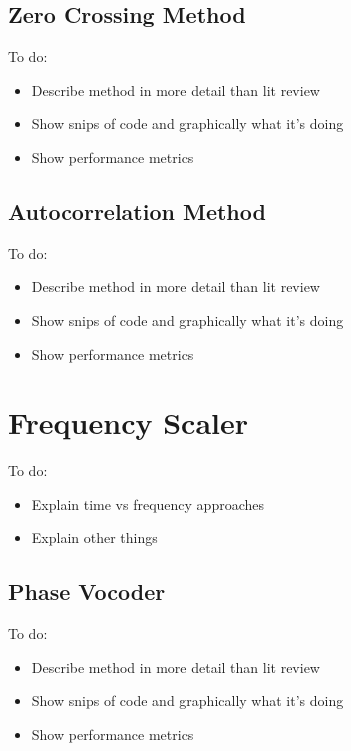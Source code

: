\subsection{Zero Crossing Method}

\color{red}
To do:
\begin{itemize}
	\item Describe method in more detail than lit review
	\item Show snips of code and graphically what it's doing
	\item Show performance metrics
\end{itemize}
\color{black}

\subsection{Autocorrelation Method}

\color{red}
To do:
\begin{itemize}
	\item Describe method in more detail than lit review
	\item Show snips of code and graphically what it's doing
	\item Show performance metrics
\end{itemize}
\color{black}

\section{Frequency Scaler}

\color{red}
To do:
\begin{itemize}
	\item Explain time vs frequency approaches
	\item Explain other things
\end{itemize}
\color{black}

\subsection{Phase Vocoder}

\color{red}
To do:
\begin{itemize}
	\item Describe method in more detail than lit review
	\item Show snips of code and graphically what it's doing
	\item Show performance metrics
\end{itemize}
\color{black}


